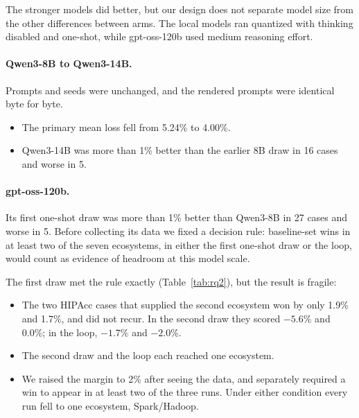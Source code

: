 The stronger models did better, but our design does not separate model size from the other differences between arms. The local models ran quantized with thinking disabled and one-shot, while gpt-oss-120b used medium reasoning effort.

\paragraph{Qwen3-8B to Qwen3-14B.} Prompts and seeds were unchanged, and the rendered prompts were identical byte for byte.
\begin{itemize}
  \item The primary mean loss fell from 5.24\% to 4.00\%.
  \item Qwen3-14B was more than 1\% better than the earlier 8B draw in 16 cases and worse in 5.
\end{itemize}

\paragraph{gpt-oss-120b.} Its first one-shot draw was more than 1\% better than Qwen3-8B in 27 cases and worse in 5. Before collecting its data we fixed a decision rule: baseline-set wins in at least two of the seven ecosystems, in either the first one-shot draw or the loop, would count as evidence of headroom at this model scale.

The first draw met the rule exactly (Table~\ref{tab:rq2}), but the result is fragile:
\begin{itemize}
  \item The two HIPAcc cases that supplied the second ecosystem won by only 1.9\% and 1.7\%, and did not recur. In the second draw they scored $-5.6\%$ and 0.0\%; in the loop, $-1.7\%$ and $-2.0\%$.
  \item The second draw and the loop each reached one ecosystem.
  \item We raised the margin to 2\% after seeing the data, and separately required a win to appear in at least two of the three runs. Under either condition every run fell to one ecosystem, Spark/Hadoop.
\end{itemize}

